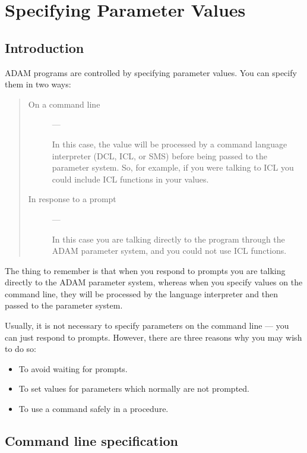 \chapter{Specifying Parameter Values}
\label{C_prompts}

\section{Introduction}
\label{S_p2dint}

ADAM programs are controlled by specifying parameter values.
You can specify them in two ways:

\begin{quote}
\begin{description}

\item [On a command line] ---

In this case, the value will be processed by a command language interpreter
(DCL, ICL, or SMS) before being passed to the parameter system.
So, for example, if you were talking to ICL you could include ICL functions
in your values.

\item [In response to a prompt] ---

In this case you are talking directly to the program through the ADAM parameter
system, and you could not use ICL functions.

\end{description}
\end{quote}

The thing to remember is that when you respond to prompts you are talking
directly to the ADAM parameter system, whereas when you specify values on the
command line, they will be processed by the language interpreter and then passed
to the parameter system.

Usually, it is not necessary to specify parameters on the command line --- you
can just respond to prompts.
However, there are three reasons why you may wish to do so:
\begin{itemize}
\item To avoid waiting for prompts.
\item To set values for parameters which normally are not prompted.
\item To use a command safely in a procedure.
\end{itemize}

\section{Command line specification}
\label{S_cls}


